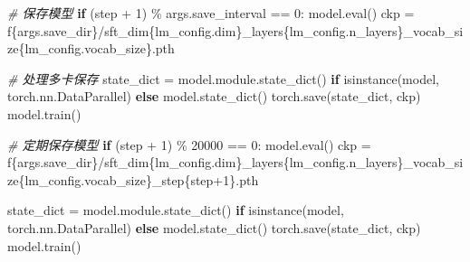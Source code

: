 \documentclass[
]{article}
\newenvironment{Shaded}{}{}
\newcommand{\BuiltInTok}[1]{\textcolor[rgb]{0.00,0.50,0.00}{#1}}
\newcommand{\CommentTok}[1]{\textcolor[rgb]{0.38,0.63,0.69}{\textit{#1}}}
\newcommand{\ControlFlowTok}[1]{\textcolor[rgb]{0.00,0.44,0.13}{\textbf{#1}}}
\newcommand{\DecValTok}[1]{\textcolor[rgb]{0.25,0.63,0.44}{#1}}
\newcommand{\NormalTok}[1]{#1}
\newcommand{\OperatorTok}[1]{\textcolor[rgb]{0.40,0.40,0.40}{#1}}
\newcommand{\SpecialCharTok}[1]{\textcolor[rgb]{0.25,0.44,0.63}{#1}}
\newcommand{\SpecialStringTok}[1]{\textcolor[rgb]{0.73,0.40,0.53}{#1}}
\begin{document}
\begin{Shaded}
\begin{Highlighting}[]
        \CommentTok{\# 保存模型}
        \ControlFlowTok{if}\NormalTok{ (step }\OperatorTok{+} \DecValTok{1}\NormalTok{) }\OperatorTok{\%}\NormalTok{ args.save\_interval }\OperatorTok{==} \DecValTok{0}\NormalTok{:}
\NormalTok{            model.}\BuiltInTok{eval}\NormalTok{()}
\NormalTok{            ckp }\OperatorTok{=} \SpecialStringTok{f\textquotesingle{}}\SpecialCharTok{\{}\NormalTok{args}\SpecialCharTok{.}\NormalTok{save\_dir}\SpecialCharTok{\}}\SpecialStringTok{/sft\_dim}\SpecialCharTok{\{}\NormalTok{lm\_config}\SpecialCharTok{.}\NormalTok{dim}\SpecialCharTok{\}}\SpecialStringTok{\_layers}\SpecialCharTok{\{}\NormalTok{lm\_config}\SpecialCharTok{.}\NormalTok{n\_layers}\SpecialCharTok{\}}\SpecialStringTok{\_vocab\_size}\SpecialCharTok{\{}\NormalTok{lm\_config}\SpecialCharTok{.}\NormalTok{vocab\_size}\SpecialCharTok{\}}\SpecialStringTok{.pth\textquotesingle{}}

            \CommentTok{\# 处理多卡保存}
\NormalTok{            state\_dict }\OperatorTok{=}\NormalTok{ model.module.state\_dict() }\ControlFlowTok{if} \BuiltInTok{isinstance}\NormalTok{(model, torch.nn.DataParallel) }\ControlFlowTok{else}\NormalTok{ model.state\_dict()}
\NormalTok{            torch.save(state\_dict, ckp)}
\NormalTok{            model.train()}
        
        \CommentTok{\# 定期保存模型}
        \ControlFlowTok{if}\NormalTok{ (step }\OperatorTok{+} \DecValTok{1}\NormalTok{) }\OperatorTok{\%} \DecValTok{20000} \OperatorTok{==} \DecValTok{0}\NormalTok{:}
\NormalTok{            model.}\BuiltInTok{eval}\NormalTok{()}
\NormalTok{            ckp }\OperatorTok{=} \SpecialStringTok{f\textquotesingle{}}\SpecialCharTok{\{}\NormalTok{args}\SpecialCharTok{.}\NormalTok{save\_dir}\SpecialCharTok{\}}\SpecialStringTok{/sft\_dim}\SpecialCharTok{\{}\NormalTok{lm\_config}\SpecialCharTok{.}\NormalTok{dim}\SpecialCharTok{\}}\SpecialStringTok{\_layers}\SpecialCharTok{\{}\NormalTok{lm\_config}\SpecialCharTok{.}\NormalTok{n\_layers}\SpecialCharTok{\}}\SpecialStringTok{\_vocab\_size}\SpecialCharTok{\{}\NormalTok{lm\_config}\SpecialCharTok{.}\NormalTok{vocab\_size}\SpecialCharTok{\}}\SpecialStringTok{\_step}\SpecialCharTok{\{}\NormalTok{step}\OperatorTok{+}\DecValTok{1}\SpecialCharTok{\}}\SpecialStringTok{.pth\textquotesingle{}}

\NormalTok{            state\_dict }\OperatorTok{=}\NormalTok{ model.module.state\_dict() }\ControlFlowTok{if} \BuiltInTok{isinstance}\NormalTok{(model, torch.nn.DataParallel) }\ControlFlowTok{else}\NormalTok{ model.state\_dict()}
\NormalTok{            torch.save(state\_dict, ckp)}
\NormalTok{            model.train()}



\end{Highlighting}
\end{Shaded}
\end{document}

